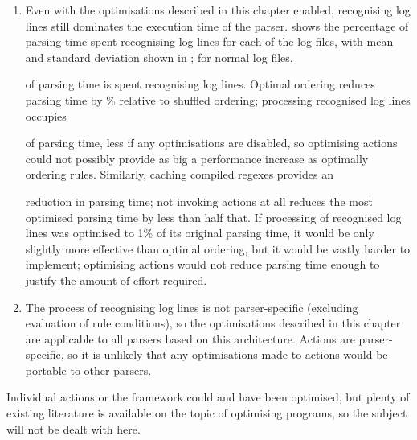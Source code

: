 \begin{enumerate}

    \item Even with the optimisations described in this chapter enabled,
        recognising log lines still dominates the execution time of the
        parser.   shows the percentage of parsing time spent recognising
        log lines for each of the \numberOFlogFILES{} log files, with mean
        and standard deviation shown in ; for normal log files,
        
        of parsing time is spent recognising log lines.  Optimal ordering
        reduces parsing time by
        \%
        relative to shuffled ordering; processing recognised log lines
        occupies
        
        of parsing time, less if any optimisations are disabled, so
        optimising actions could not possibly provide as big a performance
        increase as optimally ordering rules.  Similarly, caching compiled
        regexes provides an
        
        reduction in parsing time; not invoking actions at all reduces the
        most optimised parsing time by less than half that.  If processing
        of recognised log lines was optimised to 1\% of its original
        parsing time, it would be only slightly more effective than optimal
        ordering, but it would be vastly harder to implement; optimising
        actions would not reduce parsing time enough to justify the amount
        of effort required.

    \item The process of recognising log lines is not parser-specific
        (excluding evaluation of rule conditions), so the optimisations
        described in this chapter are applicable to all parsers based on
        this architecture.  Actions are parser-specific, so it is unlikely
        that any optimisations made to actions would be portable to other
        parsers.

\end{enumerate}

Individual actions or the framework could and have been optimised, but
plenty of existing literature is available on the topic of optimising
programs, so the subject will not be dealt with here.


